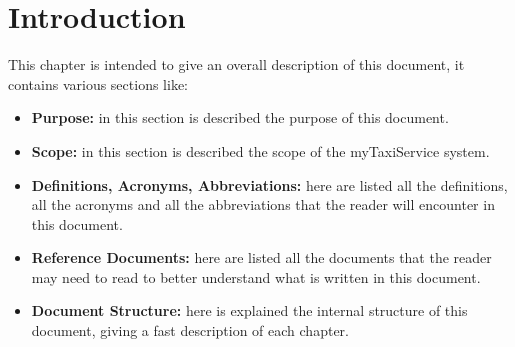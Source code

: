 \documentclass[../../dd.tex]{subfiles}
\begin{document}
	\chapter{Introduction}
		This chapter is intended to give an overall description of this document, it contains various sections like:
		\begin{itemize}
			\item \textbf{Purpose:} in this section is described the purpose of this document.
			\item \textbf{Scope:} in this section is described the scope of the myTaxiService system.
			\item \textbf{Definitions, Acronyms, Abbreviations:} here are listed all the definitions, all the acronyms and all the abbreviations that the reader will encounter in this document.
			\item \textbf{Reference Documents:} here are listed all the documents that the reader may need to read to better understand what is written in this document.
			\item \textbf{Document Structure:} here is explained the internal structure of this document, giving a fast description of each chapter.
		\end{itemize}

		

		

		

		

		
\end{document}
